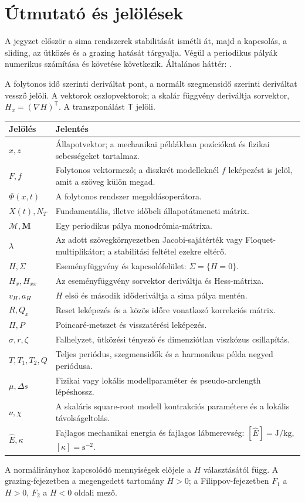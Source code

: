 \chapter*{Útmutató és jelölések}
A jegyzet először a sima rendszerek stabilitását ismétli át, majd a kapcsolás, a sliding, az ütközés és a grazing hatását tárgyalja. Végül a periodikus pályák numerikus számítása és követése következik. Általános háttér: \cite{dib}.

A folytonos idő szerinti deriváltat pont, a normált szegmensidő szerinti deriváltat vessző jelöli. A vektorok oszlopvektorok; a skalár függvény deriváltja sorvektor, $H_x=(\nabla H)^\mathsf T$. A transzponálást $\mathsf T$ jelöli.
\begin{longtable}{@{}p{}p{}@{}}
\toprule Jelölés & Jelentés\\\midrule\endhead
$x,z$ & Állapotvektor; a mechanikai példákban pozíciókat és fizikai sebességeket tartalmaz.\\
$F,f$ & Folytonos vektormező; a diszkrét modelleknél $f$ leképezést is jelöl, amit a szöveg külön megad.\\
$\Phi(x,t)$ & A folytonos rendszer megoldásoperátora.\\
$X(t),N_T$ & Fundamentális, illetve időbeli állapotátmeneti mátrix.\\
$\mathcal M,\mathbf M$ & Egy periodikus pálya monodrómia-mátrixa.\\
$\lambda$ & Az adott szövegkörnyezetben Jacobi-sajátérték vagy Floquet-multiplikátor; a stabilitási feltétel ezekre eltérő.\\
$H,\Sigma$ & Eseményfüggvény és kapcsolófelület: $\Sigma=\{H=0\}$.\\
$H_x,H_{xx}$ & Az eseményfüggvény sorvektor deriváltja és Hess-mátrixa.\\
$v_H,a_H$ & $H$ első és második időderiváltja a sima pálya mentén.\\
$R,Q_x$ & Reset leképezés és a közös időre vonatkozó korrekciós mátrix.\\
$\Pi,P$ & Poincaré-metszet és visszatérési leképezés.\\
$\sigma,r,\zeta$ & Falhelyzet, ütközési tényező és dimenziótlan viszkózus csillapítás.\\
$T,T_1,T_2,Q$ & Teljes periódus, szegmensidők és a harmonikus példa negyed periódusa.\\
$\mu,\Delta s$ & Fizikai vagy lokális modellparaméter és pseudo-arclength lépéshossz.\\
$\nu,\chi$ & A skaláris square-root modell kontrakciós paramétere és a lokális távolságeltolás.\\
$\hat E,\kappa$ & Fajlagos mechanikai energia és fajlagos lábmerevség: $[\hat E]=\mathrm{J/kg}$, $[\kappa]=\mathrm{s^{-2}}$.\\
\bottomrule
\end{longtable}
A normálirányhoz kapcsolódó mennyiségek előjele a $H$ választásától függ. A grazing-fejezetben a megengedett tartomány $H>0$; a Filippov-fejezetben $F_1$ a $H>0$, $F_2$ a $H<0$ oldali mező.


